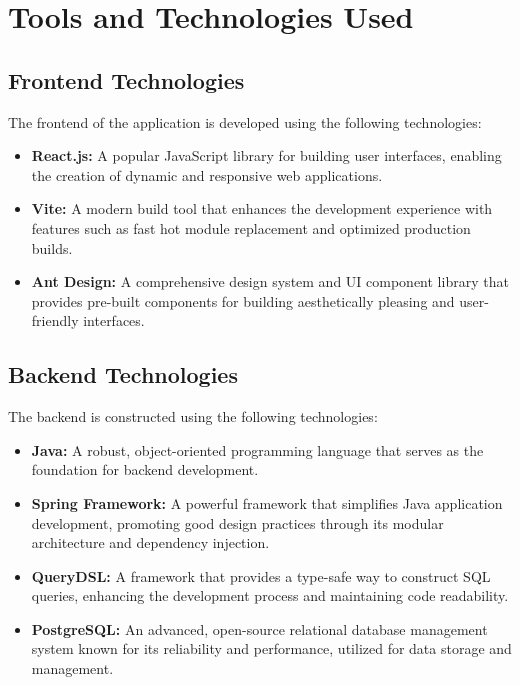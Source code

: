 \section{Tools and Technologies Used}
\subsection{Frontend Technologies}
The frontend of the application is developed using the following technologies:
\begin{itemize}
    \item \textbf{React.js:} A popular JavaScript library for building user interfaces, enabling the creation of dynamic and responsive web applications.
    \item \textbf{Vite:} A modern build tool that enhances the development experience with features such as fast hot module replacement and optimized production builds.
    \item \textbf{Ant Design:} A comprehensive design system and UI component library that provides pre-built components for building aesthetically pleasing and user-friendly interfaces.
\end{itemize}

\subsection{Backend Technologies}
The backend is constructed using the following technologies:
\begin{itemize}
    \item \textbf{Java:} A robust, object-oriented programming language that serves as the foundation for backend development.
    \item \textbf{Spring Framework:} A powerful framework that simplifies Java application development, promoting good design practices through its modular architecture and dependency injection.
    \item \textbf{QueryDSL:} A framework that provides a type-safe way to construct SQL queries, enhancing the development process and maintaining code readability.
    \item \textbf{PostgreSQL:} An advanced, open-source relational database management system known for its reliability and performance, utilized for data storage and management.
\end{itemize}

